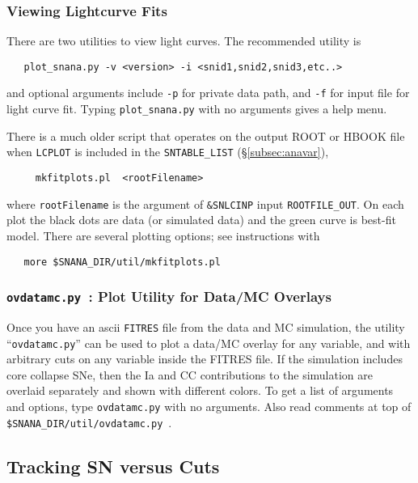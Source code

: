 \documentclass[12pt]{article}
\newcommand{\snanadir}{{\tt SNANA\_DIR}}
\begin{document}
  \subsubsection{Viewing Lightcurve Fits }
   \label{sss:lcplot}

There are two utilities to view light curves. 
The recommended utility is
\begin{verbatim}
   plot_snana.py -v <version> -i <snid1,snid2,snid3,etc..>
\end{verbatim}
and optional arguments include {\tt -p} for private data path,
and {\tt -f} for input file for light curve fit. 
Typing {\tt plot\_snana.py} with no arguments gives a help menu.


There is a much older script that operates on the output ROOT or HBOOK
file when {\tt LCPLOT} is included in the {\tt SNTABLE\_LIST}
(\S\ref{subsec:anavar}),
%
\begin{verbatim}
     mkfitplots.pl  <rootFilename>
\end{verbatim}
%
where {\tt rootFilename} is the argument of {\tt \&SNLCINP}
input {\tt ROOTFILE\_OUT}.
On each plot the black dots are data (or simulated data)
and the green curve is best-fit model.
There are several plotting options; see instructions with
\begin{verbatim}
   more $SNANA_DIR/util/mkfitplots.pl
\end{verbatim}

  \subsubsection{{\tt ovdatamc.py}~: Plot Utility for Data/MC Overlays}
  \label{sss:ovdatamc}

Once you have an ascii {\tt FITRES} file from the data and
MC simulation, the utility ``{\tt ovdatamc.py}'' can be used
to plot a data/MC overlay for any variable, and with arbitrary
cuts on any variable inside the FITRES file. If the simulation
includes core collapse SNe, then the Ia and CC contributions
to the simulation are overlaid separately and shown with
different colors. To get a list of arguments and options,
type {\tt ovdatamc.py} with no arguments. Also read comments
at top of {\tt \$\snanadir/util/ovdatamc.py}~.



   \subsection{Tracking SN versus Cuts}
   \label{subsec:sncuts}
\end{document}
